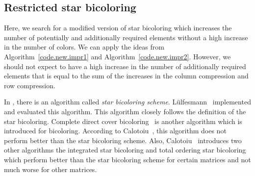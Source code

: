 \documentclass[12pt, twoside,a4paper,toc=bibliography]{scrbook}
\newcommand{\coderef}[1]{Algorithm~\protect\ref{#1}}
\begin{document}
\clearpage
\subsection{Restricted star bicoloring}
\label{s.heuristic.starbicoloring}
Here, we search for a modified version of star bicoloring
which increases the number of potentially and additionally required elements without
a high increase in the number of colors.
We can apply the ideas from \coderef{code.new.impr1} and \coderef{code.new.impr2}.
However, we should not expect to have a high increase in the number of additionally required elements
that is equal to the sum of the increases in the column compression and row compression.

In \cite{Gebremedhin05whatcolor}, there is an algorithm called \textit{star bicoloring scheme}.
Lülfesmann~\cite{LulfesmannMaster} implemented and evaluated this algorithm.
This algorithm closely follows the definition of the star bicoloring.
Complete direct cover bicoloring~\cite{hs:csj}
is another algorithm which is introduced for bicoloring.
According to Calotoiu~\cite{CalotoiuMaster}, this algorithm does not perform
better than the star bicoloring scheme.
Also, Calotoiu~\cite{CalotoiuMaster} introduces two other algorithms the integrated star bicoloring
and total ordering star bicoloring which perform better than
the star bicoloring scheme for certain matrices and not much worse for other matrices.
\end{document}
